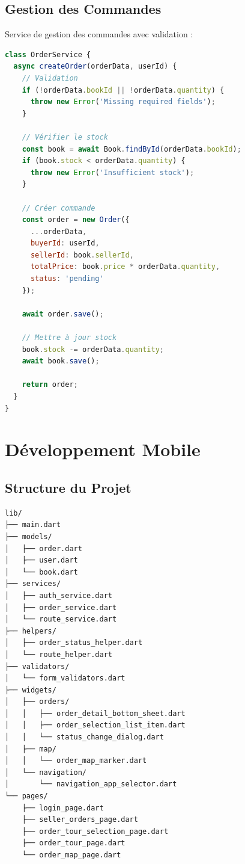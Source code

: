 \documentclass[12pt,a4paper]{report}
\begin{document}
\subsection{Gestion des Commandes}

Service de gestion des commandes avec validation :

\begin{lstlisting}[language=JavaScript, caption=Service Order]
class OrderService {
  async createOrder(orderData, userId) {
    // Validation
    if (!orderData.bookId || !orderData.quantity) {
      throw new Error('Missing required fields');
    }

    // Vérifier le stock
    const book = await Book.findById(orderData.bookId);
    if (book.stock < orderData.quantity) {
      throw new Error('Insufficient stock');
    }

    // Créer commande
    const order = new Order({
      ...orderData,
      buyerId: userId,
      sellerId: book.sellerId,
      totalPrice: book.price * orderData.quantity,
      status: 'pending'
    });

    await order.save();

    // Mettre à jour stock
    book.stock -= orderData.quantity;
    await book.save();

    return order;
  }
}
\end{lstlisting}

\section{Développement Mobile}

\subsection{Structure du Projet}

\begin{verbatim}
lib/
├── main.dart
├── models/
│   ├── order.dart
│   ├── user.dart
│   └── book.dart
├── services/
│   ├── auth_service.dart
│   ├── order_service.dart
│   └── route_service.dart
├── helpers/
│   ├── order_status_helper.dart
│   └── route_helper.dart
├── validators/
│   └── form_validators.dart
├── widgets/
│   ├── orders/
│   │   ├── order_detail_bottom_sheet.dart
│   │   ├── order_selection_list_item.dart
│   │   └── status_change_dialog.dart
│   ├── map/
│   │   └── order_map_marker.dart
│   └── navigation/
│       └── navigation_app_selector.dart
└── pages/
    ├── login_page.dart
    ├── seller_orders_page.dart
    ├── order_tour_selection_page.dart
    ├── order_tour_page.dart
    └── order_map_page.dart
\end{verbatim}
\end{document}
